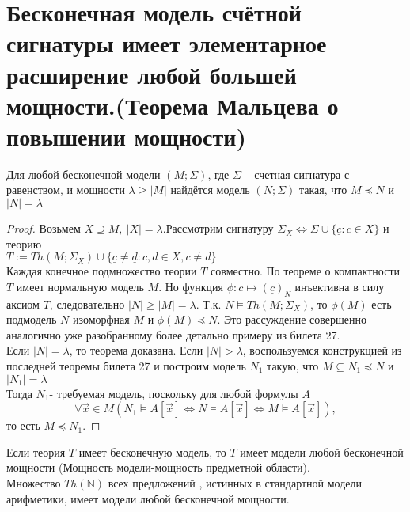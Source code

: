 \section{Бесконечная модель счётной сигнатуры имеет элементарное расширение
любой большей мощности.(Теорема Мальцева о повышении мощности)}
\begin{theorem} 
 Для любой бесконечной модели $(M ;\Sigma)$, где $\Sigma$ -- счетная сигнатура с равенством, и мощности $\lambda \ge |M|$ найдётся модель $(N ;\Sigma)$ такая, что $M \preccurlyeq N$ и $|N|=\lambda$
\end{theorem}
\begin{proof}
    Возьмем $ X \supseteq M,\:|X|=\lambda$.Рассмотрим сигнатуру $\Sigma_X \Longleftrightarrow \Sigma \cup\{\underline{c}: c \in X\}$ и теорию \\ $T:=Th\left(M ; \Sigma_{X}\right) \cup\{\underline{c} \neq \underline{d}: c, d \in X, c \neq d\}$\\
    Каждая конечное подмножество теории $T$ совместно. По теореме о компактности $T$ имеет нормальную модель $M$. Но функция $\phi : c \longmapsto(\underline{c})_{N}$ инъективна в силу аксиом $T$, следовательно $|N|\ge |M|=\lambda$. Т.к. $N\vDash Th(M;\Sigma_X)$, то $\phi(M)$ есть подмодель $N$ изоморфная $M$ и $\phi(M) \preccurlyeq N$. Это рассуждение совершенно аналогично уже разобранному более детально примеру из билета 27.\\
    Если $|N|=\lambda$, то теорема доказана. Если $|N|>\lambda$, воспользуемся конструкцией из последней теоремы билета 27 и построим модель $N_1$ такую, что $M \subseteq N_{1} \preccurlyeq N$ и $\left|N_{1}\right|=\lambda$\\
    Тогда $N_1$- требуемая модель, поскольку для любой формулы $A$\\
    $$\forall \vec{x} \in M\left(N_{1} \vDash A[\vec{x}] \Longleftrightarrow N \vDash A[\vec{x}] \Longleftrightarrow M \vDash A[\vec{x}]\right),$$ то есть $M \preccurlyeq N_1$.
\end{proof}
\begin{corollary}
Если теория $T$ имеет бесконечную модель, то $T$ имеет модели любой бесконечной мощности (Мощность модели-мощность предметной области).\\ 
Множество $Th(\mathbb{N})$ всех предложений , истинных в стандартной модели арифметики, имеет модели любой бесконечной мощности.
\end{corollary}